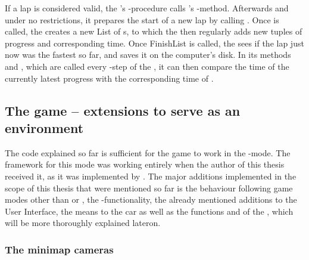 If a lap is considered valid, the 's -procedure calls 's -method. Afterwards and under no restrictions, it prepares the start of a new lap by calling . Once  is called, the  creates a new List of s, to which the  then regularly adds new tuples of progress and corresponding time. Once FinishList is called, the  sees if the lap just now was the fastest so far, and saves it on the computer's disk. In its methods  and , which are called every -step of the , it can then compare the time of the currently latest progress with the corresponding time of . \\

\subsection{The game -- extensions to serve as an environment}

The code explained so far is sufficient for the game to work in the -mode. The framework for this mode was working entirely when the author of this thesis received it, as it was implemented by \leon. The major additions implemented in the scope of this thesis that were mentioned so far is the behaviour following game modes other than  or , the -functionality, the already mentioned additions to the User Interface, the means to  the car as well as the functions  and  of the , which will be more thoroughly explained lateron.

\subsubsection{The minimap cameras}

